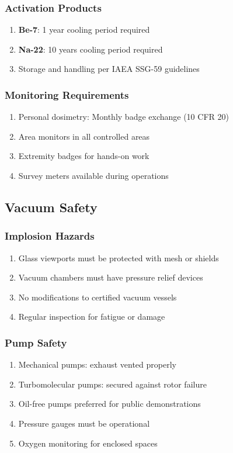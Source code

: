 \subsubsection{Activation Products}
\begin{enumerate}[noitemsep]
    \item \textbf{Be-7}: 1 year cooling period required
    \item \textbf{Na-22}: 10 years cooling period required
    \item Storage and handling per IAEA SSG-59 guidelines
\end{enumerate}

\subsubsection{Monitoring Requirements}
\begin{enumerate}[noitemsep]
    \item Personal dosimetry: Monthly badge exchange (10 CFR 20)
    \item Area monitors in all controlled areas
    \item Extremity badges for hands-on work
    \item Survey meters available during operations
\end{enumerate}

\subsection{Vacuum Safety}

\subsubsection{Implosion Hazards}
\begin{enumerate}[noitemsep]
    \item Glass viewports must be protected with mesh or shields
    \item Vacuum chambers must have pressure relief devices
    \item No modifications to certified vacuum vessels
    \item Regular inspection for fatigue or damage
\end{enumerate}

\subsubsection{Pump Safety}
\begin{enumerate}[noitemsep]
    \item Mechanical pumps: exhaust vented properly
    \item Turbomolecular pumps: secured against rotor failure
    \item Oil-free pumps preferred for public demonstrations
    \item Pressure gauges must be operational
    \item Oxygen monitoring for enclosed spaces
\end{enumerate}

